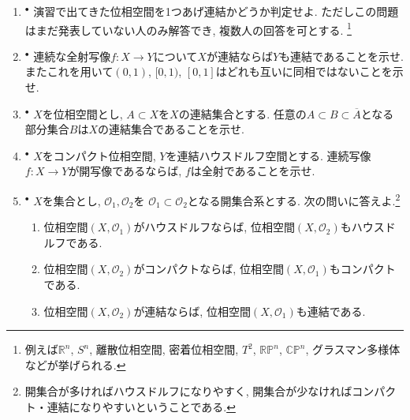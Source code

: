 \documentclass[dvipdfmx,a4paper,11pt]{article}
\newcommand{\R}{\mathbb{R}}
\newcommand{\C}{\mathbb{C}}
\theoremstyle{definition}
\begin{document}
\begin{enumerate}[label=\textbf{問}9.\arabic*]

\item $^{\bullet}$ 演習で出てきた位相空間を1つあげ連結かどうか判定せよ. ただしこの問題はまだ発表していない人のみ解答でき, 複数人の回答を可とする.
\footnote{例えば$\R^n$, $S^{n}$, 離散位相空間, 密着位相空間, $T^2$, $\R\mathbb{P}^n$, $\C\mathbb{P}^n$, グラスマン多様体などが挙げられる. }%


\item $^{\bullet}$ 連続な全射写像$f: X \rightarrow Y$について$X$が連結ならば$Y$も連結であることを示せ. またこれを用いて$(0,1)$, $[0,1)$, $[0,1]$はどれも互いに同相ではないことを示せ.


\item $^{\bullet}$ $X$を位相空間とし, $A \subset X$を$X$の連結集合とする. 任意の$A \subset B \subset \overline{A}$となる部分集合$B$は$X$の連結集合であることを示せ.


\item $^{\bullet}$  $X$をコンパクト位相空間, $Y$を連結ハウスドルフ空間とする. 連続写像$f : X \rightarrow Y$が開写像であるならば, $f$は全射であることを示せ. 

\item $^{\bullet}$ $X$を集合とし, $\mathscr{O}_1, \mathscr{O}_2$を $\mathscr{O}_1 \subset \mathscr{O}_2$となる開集合系とする. 次の問いに答えよ.\footnote{開集合が多ければハウスドルフになりやすく, 開集合が少なければコンパクト・連結になりやすいということである.}
\begin{enumerate}
\setlength{\parskip}{0cm}
  \setlength{\itemsep}{2pt} 
\item 位相空間$(X, \mathscr{O}_1)$がハウスドルフならば, 位相空間$(X, \mathscr{O}_2)$もハウスドルフである.
\item 位相空間$(X, \mathscr{O}_2)$がコンパクトならば, 位相空間$(X, \mathscr{O}_1)$もコンパクトである.
\item 位相空間$(X, \mathscr{O}_2)$が連結ならば, 位相空間$(X, \mathscr{O}_1)$も連結である.
\end{enumerate}



\end{enumerate}
\end{document}
